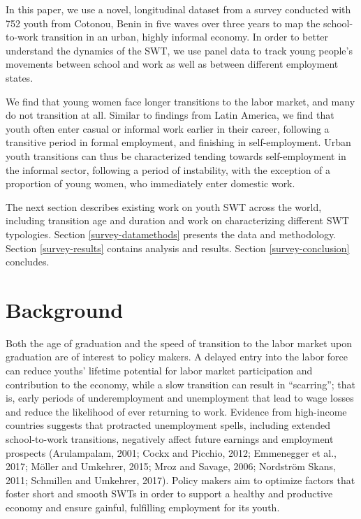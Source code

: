 \documentclass[
  11pt,
a4paper
]{article}
\begin{document}
In this paper, we use a novel, longitudinal dataset from a survey conducted with 752 youth from Cotonou, Benin in five waves over three years to map the school-to-work transition in an urban, highly informal economy. In order to better understand the dynamics of the SWT, we use panel data to track young people's movements between school and work as well as between different employment states.

We find that young women face longer transitions to the labor market, and many do not transition at all. Similar to findings from Latin America, we find that youth often enter casual or informal work earlier in their career, following a transitive period in formal employment, and finishing in self-employment. Urban youth transitions can thus be characterized tending towards self-employment in the informal sector, following a period of instability, with the exception of a proportion of young women, who immediately enter domestic work.

The next section describes existing work on youth SWT across the world, including transition age and duration and work on characterizing different SWT typologies. Section \ref{survey-datamethods} presents the data and methodology. Section \ref{survey-results} contains analysis and results. Section \ref{survey-conclusion} concludes.

\hypertarget{survey-background}{%
\section{Background}\label{survey-background}}

Both the age of graduation and the speed of transition to the labor market upon graduation are of interest to policy makers. A delayed entry into the labor force can reduce youths' lifetime potential for labor market participation and contribution to the economy, while a slow transition can result in ``scarring''; that is, early periods of underemployment and unemployment that lead to wage losses and reduce the likelihood of ever returning to work. Evidence from high-income countries suggests that protracted unemployment spells, including extended school-to-work transitions, negatively affect future earnings and employment prospects (Arulampalam, 2001; Cockx and Picchio, 2012; Emmenegger et al., 2017; Möller and Umkehrer, 2015; Mroz and Savage, 2006; Nordström Skans, 2011; Schmillen and Umkehrer, 2017). Policy makers aim to optimize factors that foster short and smooth SWTs in order to support a healthy and productive economy and ensure gainful, fulfilling employment for its youth.
\end{document}
